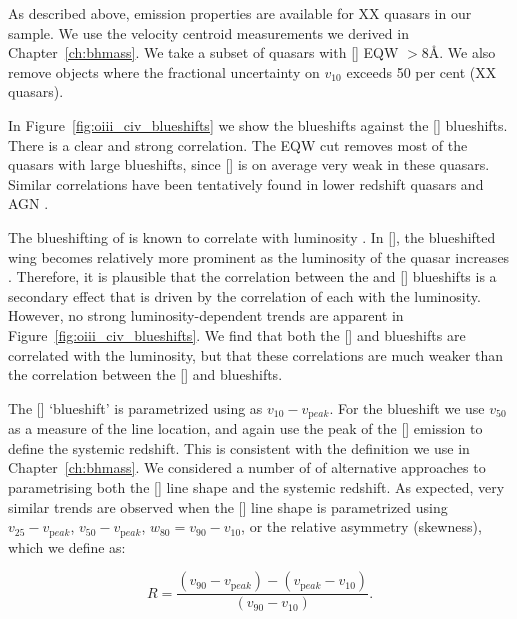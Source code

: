 As described above,  emission properties are available for XX quasars in our sample. 
We use the  velocity centroid measurements we derived in Chapter~\ref{ch:bhmass}.
We take a subset of quasars with [] EQW $>8$\AA. 
We also remove objects where the fractional uncertainty on $v_{10}$ exceeds 50 per cent (XX quasars). 

In Figure~\ref{fig:oiii_civ_blueshifts} we show the  blueshifts against the [] blueshifts.
There is a clear and strong correlation. 
The EQW cut removes most of the quasars with large  blueshifts, since [] is on average very weak in these quasars. 
Similar correlations have been tentatively found in lower redshift quasars and AGN \citep{zamanov02}. 

The blueshifting of  is known to correlate with luminosity \citep{richards11}.
In [], the blueshifted wing becomes relatively more prominent as the luminosity of the quasar increases \citep{shen14}. 
Therefore, it is plausible that the correlation between the  and [] blueshifts is a secondary effect that is driven by the correlation of each with the luminosity. 
However, no strong luminosity-dependent trends are apparent in Figure~\ref{fig:oiii_civ_blueshifts}. 
We find that both the [] and  blueshifts are correlated with the luminosity, but that these correlations are much weaker than the correlation between the [] and  blueshifts. 

The [] `blueshift' is parametrized using as $v_{10} - v_{\mathrm peak}$.
For the  blueshift we use $v_{50}$ as a measure of the line location, and again use the peak of the [] emission to define the systemic redshift. 
This is consistent with the definition we use in Chapter~\ref{ch:bhmass}. 
We considered a number of of alternative approaches to parametrising both the [] line shape and the systemic redshift. 
As expected, very similar trends are observed when the [] line shape is parametrized using $v_{25} - v_{\mathrm peak}$, $v_{50} - v_{\mathrm peak}$, $w_{80} = v_{90} - v_{10}$, or the relative asymmetry (skewness), which we define as:

\begin{equation}
  R = \frac{(v_{90} - v_{\mathrm peak}) - (v_{\mathrm peak} - v_{10})}{(v_{90} - v_{10})}.     
\end{equation} 

